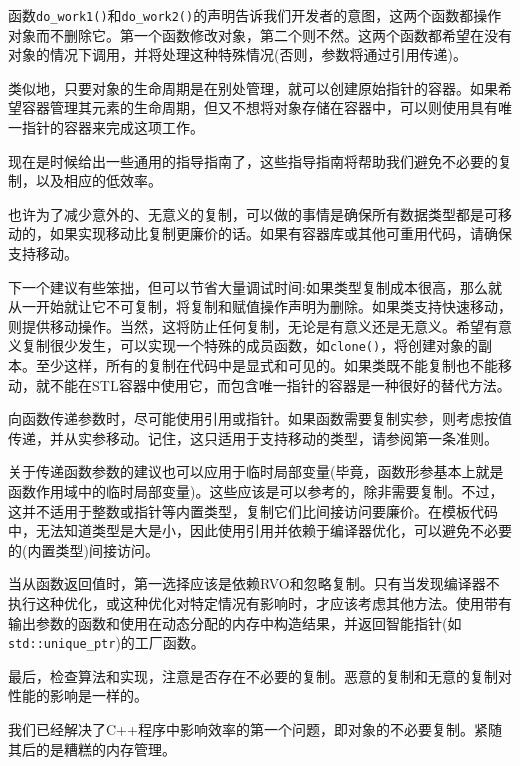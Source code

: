 函数\texttt{do\_work1()}和\texttt{do\_work2()}的声明告诉我们开发者的意图，这两个函数都操作对象而不删除它。第一个函数修改对象，第二个则不然。这两个函数都希望在没有对象的情况下调用，并将处理这种特殊情况(否则，参数将通过引用传递)。 

类似地，只要对象的生命周期是在别处管理，就可以创建原始指针的容器。如果希望容器管理其元素的生命周期，但又不想将对象存储在容器中，可以则使用具有唯一指针的容器来完成这项工作。 

现在是时候给出一些通用的指导指南了，这些指导指南将帮助我们避免不必要的复制，以及相应的低效率。


也许为了减少意外的、无意义的复制，可以做的事情是确保所有数据类型都是可移动的，如果实现移动比复制更廉价的话。如果有容器库或其他可重用代码，请确保支持移动。 

下一个建议有些笨拙，但可以节省大量调试时间:如果类型复制成本很高，那么就从一开始就让它不可复制，将复制和赋值操作声明为删除。如果类支持快速移动，则提供移动操作。当然，这将防止任何复制，无论是有意义还是无意义。希望有意义复制很少发生，可以实现一个特殊的成员函数，如\texttt{clone()}，将创建对象的副本。至少这样，所有的复制在代码中是显式和可见的。如果类既不能复制也不能移动，就不能在STL容器中使用它，而包含唯一指针的容器是一种很好的替代方法。 

向函数传递参数时，尽可能使用引用或指针。如果函数需要复制实参，则考虑按值传递，并从实参移动。记住，这只适用于支持移动的类型，请参阅第一条准则。

关于传递函数参数的建议也可以应用于临时局部变量(毕竟，函数形参基本上就是函数作用域中的临时局部变量)。这些应该是可以参考的，除非需要复制。不过，这并不适用于整数或指针等内置类型，复制它们比间接访问要廉价。在模板代码中，无法知道类型是大是小，因此使用引用并依赖于编译器优化，可以避免不必要的(内置类型)间接访问。

当从函数返回值时，第一选择应该是依赖RVO和忽略复制。只有当发现编译器不执行这种优化，或这种优化对特定情况有影响时，才应该考虑其他方法。使用带有输出参数的函数和使用在动态分配的内存中构造结果，并返回智能指针(如\texttt{std::unique\_ptr})的工厂函数。 

最后，检查算法和实现，注意是否存在不必要的复制。恶意的复制和无意的复制对性能的影响是一样的。

我们已经解决了C++程序中影响效率的第一个问题，即对象的不必要复制。紧随其后的是糟糕的内存管理。














